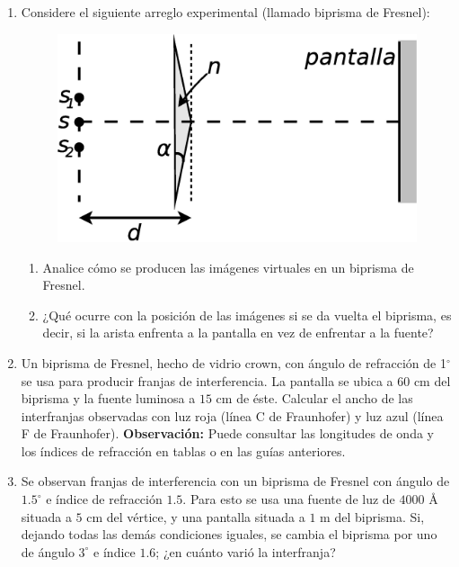 \documentclass[11pt,spanish]{article}
\begin{document}
\begin{enumerate}

    \item Considere el siguiente arreglo experimental (llamado biprisma de Fresnel):
    \begin{figure}[H]
        \centering{}
        \includegraphics[clip,scale=0.3]{figs/ej5-11}
    \end{figure}
    \begin{enumerate}
        \item Analice cómo se producen las imágenes virtuales en un biprisma de
        Fresnel.
        \item ¿Qué ocurre con la posición de las imágenes si se da vuelta el biprisma,
        es decir, si la arista enfrenta a la pantalla en vez de enfrentar
        a la fuente?
    \end{enumerate}

    
    \item Un biprisma de Fresnel, hecho de vidrio crown, con ángulo de
    refracción de 1$^{\circ}$ se usa para producir franjas de interferencia.
    La pantalla se ubica a $60$ cm del biprisma y la fuente luminosa a $15$ cm
    de éste. Calcular el ancho de las interfranjas observadas con luz roja
    (línea C de Fraunhofer) y luz azul (línea F de Fraunhofer). 
    \textbf{Observación:} Puede consultar las longitudes de onda y los índices
    de refracción en tablas o en las guías anteriores.
    

    \item Se observan franjas de interferencia con un biprisma de Fresnel con
    ángulo de $1.5^{\circ}$ e índice de refracción $1.5$. Para esto se usa una
    fuente de luz de $4000$ Å situada a $5$ cm del vértice, y una pantalla
    situada a $1$ m del biprisma. Si, dejando todas las demás condiciones
    iguales, se cambia el biprisma por uno de ángulo $3^\circ$ e índice $1.6$;
    ¿en cuánto varió la interfranja?


\end{enumerate}
\end{document}
